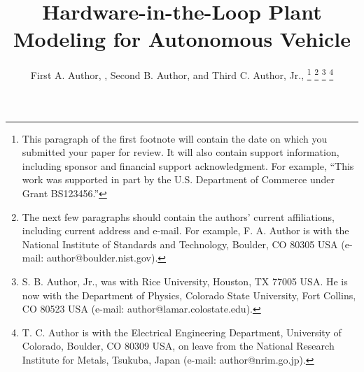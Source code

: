 \documentclass[journal,twoside,web]{ieeecolor}
\begin{document}
\title{Hardware-in-the-Loop Plant Modeling for Autonomous Vehicle}
\author{First A. Author, , Second B. Author, and Third C. Author, Jr., 
\thanks{This paragraph of the first footnote will contain the date on 
which you submitted your paper for review. It will also contain support 
information, including sponsor and financial support acknowledgment. For 
example, ``This work was supported in part by the U.S. Department of 
Commerce under Grant BS123456.'' }
\thanks{The next few paragraphs should contain 
the authors' current affiliations, including current address and e-mail. For 
example, F. A. Author is with the National Institute of Standards and 
Technology, Boulder, CO 80305 USA (e-mail: author@boulder.nist.gov). }
\thanks{S. B. Author, Jr., was with Rice University, Houston, TX 77005 USA. He is 
now with the Department of Physics, Colorado State University, Fort Collins, 
CO 80523 USA (e-mail: author@lamar.colostate.edu).}
\thanks{T. C. Author is with 
the Electrical Engineering Department, University of Colorado, Boulder, CO 
80309 USA, on leave from the National Research Institute for Metals, 
Tsukuba, Japan (e-mail: author@nrim.go.jp).}
}

\maketitle
\end{document}
